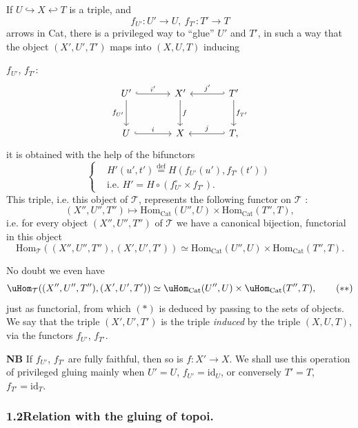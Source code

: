 If $U \hookrightarrow X \hookleftarrow T$ is a triple, and
\[
f_{U'} : U' \longrightarrow U,\ f_{T'} : T' \longrightarrow T
\]
arrows in Cat, there is a privileged way to ``glue'' $U'$ and $T'$, in such a way that the object $(X',U',T')$ maps into $(X,U,T)$ inducing


$f_{U'}$, $f_{T'}$:
\[
\begin{tikzcd}[column sep=large, row sep=large]
U' \arrow[r, hook, "i'"] \arrow[d, "f_{U'}"'] & X' \arrow[d, "f"] & T' \arrow[l, hook', "j'"'] \arrow[d, "f_{T'}"] \\
U \arrow[r, hook, "i"] & X & T, \arrow[l, hook', "j"']
\end{tikzcd}
\]
it is obtained with the help of the bifunctors
\[
\left\{\begin{aligned}
&H'(u',t') \overset{\text{def}}{=} H(f_{U'}(u'), f_{T'}(t'))\\
&\text{i.e. } H' = H \circ (f_{U'}^\circ \times f_{T'}).
\end{aligned}\right.
\]
This triple, i.e. this object of $\mathcal{T}$, represents the following functor on $\mathcal{T}$ :
\[
(X'',U'',T'') \longmapsto \mathrm{Hom}_{\mathrm{Cat}}(U'',U) \times \mathrm{Hom}_{\mathrm{Cat}}(T'',T),
\]
i.e. for every object $(X'',U'',T'')$ of $\mathcal{T}$ we have a canonical bijection, functorial in this object
\[
\mathrm{Hom}_{\mathcal{T}}((X'',U'',T''),(X',U',T')) \simeq \mathrm{Hom}_{\mathrm{Cat}}(U'',U) \times \mathrm{Hom}_{\mathrm{Cat}}(T'',T). \tag*{$(*)$}
\]


No doubt we even have
\[
\uHom_{\mathcal{T}}((X'',U'',T''),(X',U',T')) \simeq \uHom_{\mathrm{Cat}}(U'',U) \times \uHom_{\mathrm{Cat}}(T'',T), \tag*{$(**)$}
\]
just as functorial, from which $(*)$ is deduced by passing to the sets of objects. We say that the triple $(X',U',T')$ is the triple \textit{induced} by the triple $(X,U,T)$, via the functors $f_{U'}$, $f_{T'}$.

\textbf{NB} If $f_{U'}$, $f_{T'}$ are fully faithful, then so is $f : X' \longrightarrow X$. We shall use this operation of privileged gluing mainly when $U' = U$, $f_{U'} = \mathrm{id}_U$, or conversely $T' = T$, $f_{T'} = \mathrm{id}_T$.

\subsubsection*{1.2\quad Relation with the gluing of topoi.}


